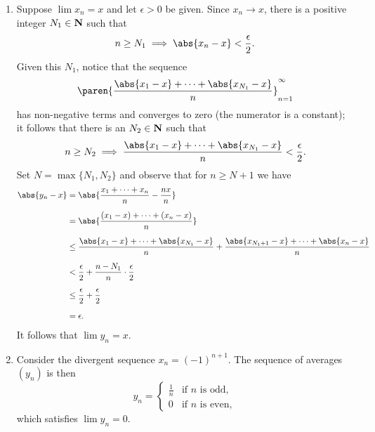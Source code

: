 \documentclass{lew98_solutions}
\begin{document}
\begin{solution}
    \begin{enumerate}
        \item Suppose \( \lim x_n = x \) and let \( \epsilon > 0 \) be given. Since \( x_n \to x \), there is a positive integer \( N_1 \in \mathbf{N} \) such that
        \[
            n \geq N_1 \implies \abs{x_n - x} < \frac{\epsilon}{2}.
        \]
        Given this \( N_1 \), notice that the sequence
        \[
            \paren{ \frac{\abs{x_1 - x} + \cdots + \abs{x_{N_1} - x}}{n} }_{n=1}^{\infty}
        \]
        has non-negative terms and converges to zero (the numerator is a constant); it follows that there is an \( N_2 \in \mathbf{N} \) such that
        \[
            n \geq N_2 \implies \frac{\abs{x_1 - x} + \cdots + \abs{x_{N_1} - x}}{n} < \frac{\epsilon}{2}.
        \]
        Set \( N = \max \{ N_1, N_2 \} \) and observe that for \( n \geq N + 1 \) we have
        \begin{align*}
            \abs{y_n - x} &= \abs{\frac{x_1 + \cdots + x_n}{n} - \frac{nx}{n}} \\[2mm]
            &= \abs{\frac{(x_1 - x) + \cdots + (x_n - x)}{n}} \\[2mm]
            &\leq \frac{\abs{x_1 - x} + \cdots + \abs{x_{N_1} - x}}{n} + \frac{\abs{x_{N_1 + 1} - x} + \cdots + \abs{x_n - x}}{n} \\[2mm]
            &< \frac{\epsilon}{2} + \frac{n - N_1}{n} \cdot \frac{\epsilon}{2} \\[2mm]
            &\leq \frac{\epsilon}{2} + \frac{\epsilon}{2} \\[2mm]
            &= \epsilon.
        \end{align*}
        It follows that \( \lim y_n = x \).

        \item Consider the divergent sequence \( x_n = (-1)^{n+1} \). The sequence of averages \( (y_n) \) is then
        \[
            y_n = \begin{cases}
                \frac{1}{n} & \text{if } n \text{ is odd}, \\
                0 & \text{if } n \text{ is even},
            \end{cases}
        \]
        which satisfies \( \lim y_n = 0 \).
    \end{enumerate}
\end{solution}
\end{document}
